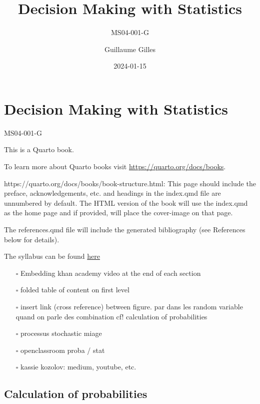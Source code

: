 \documentclass[
  letterpaper,
  DIV=11,
  numbers=noendperiod]{scrreprt}
\title{Decision Making with Statistics}
\subtitle{MS04-001-G}
\author{Guillaume Gilles}
\date{2024-01-15}
\providecommand{\tightlist}{%
  \setlength{\itemsep}{0pt}\setlength{\parskip}{0pt}}\usepackage{longtable,booktabs,array}
\renewcommand*\contentsname{Table of contents}
\newcommand\contentsname{Table of contents}
\begin{document}
\maketitle

\renewcommand*\contentsname{Table of contents}
{
\hypersetup{linkcolor=}
\setcounter{tocdepth}{2}
\tableofcontents
}

\chapter{Decision Making with
Statistics}\label{decision-making-with-statistics}

MS04-001-G

\hfill\break

This is a Quarto book.

To learn more about Quarto books visit
\url{https://quarto.org/docs/books}.

https://quarto.org/docs/books/book-structure.html: This page should
include the preface, acknowledgements, etc. and headings in the
index.qmd file are unnumbered by default. The HTML version of the book
will use the index.qmd as the home page and if provided, will place the
cover-image on that page.

The references.qmd file will include the generated bibliography (see
References below for details).

The syllabus can be found \href{syllabus.qmd}{here}

\begin{itemize}
\tightlist
\item[$\square$]
  Embedding khan academy video at the end of each section
\item[$\square$]
  folded table of content on first level
\item[$\square$]
  insert link (cross reference) between figure. par dans les random
  variable quand on parle des combination cf! calculation of
  probabilities
\item[$\square$]
  processus stochastic miage
\item[$\square$]
  openclassroom proba / stat
\item[$\square$]
  kassie kozolov: medium, youtube, etc.
\end{itemize}

\section{Calculation of
probabilities}\label{calculation-of-probabilities}
\end{document}
